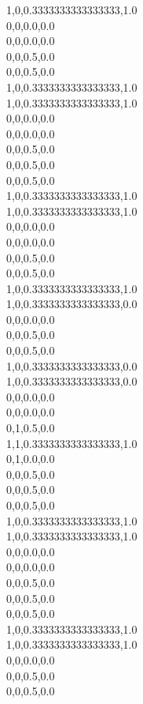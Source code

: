 1,0,0.3333333333333333,1.0\\
0,0,0.0,0.0\\
0,0,0.0,0.0\\
0,0,0.5,0.0\\
0,0,0.5,0.0\\
1,0,0.3333333333333333,1.0\\
1,0,0.3333333333333333,1.0\\
0,0,0.0,0.0\\
0,0,0.0,0.0\\
0,0,0.5,0.0\\
0,0,0.5,0.0\\
0,0,0.5,0.0\\
1,0,0.3333333333333333,1.0\\
1,0,0.3333333333333333,1.0\\
0,0,0.0,0.0\\
0,0,0.0,0.0\\
0,0,0.5,0.0\\
0,0,0.5,0.0\\
1,0,0.3333333333333333,1.0\\
1,0,0.3333333333333333,0.0\\
0,0,0.0,0.0\\
0,0,0.5,0.0\\
0,0,0.5,0.0\\
1,0,0.3333333333333333,0.0\\
1,0,0.3333333333333333,0.0\\
0,0,0.0,0.0\\
0,0,0.0,0.0\\
0,1,0.5,0.0\\
1,1,0.3333333333333333,1.0\\
0,1,0.0,0.0\\
0,0,0.5,0.0\\
0,0,0.5,0.0\\
0,0,0.5,0.0\\
1,0,0.3333333333333333,1.0\\
1,0,0.3333333333333333,1.0\\
0,0,0.0,0.0\\
0,0,0.0,0.0\\
0,0,0.5,0.0\\
0,0,0.5,0.0\\
0,0,0.5,0.0\\
1,0,0.3333333333333333,1.0\\
1,0,0.3333333333333333,1.0\\
0,0,0.0,0.0\\
0,0,0.5,0.0\\
0,0,0.5,0.0\\
